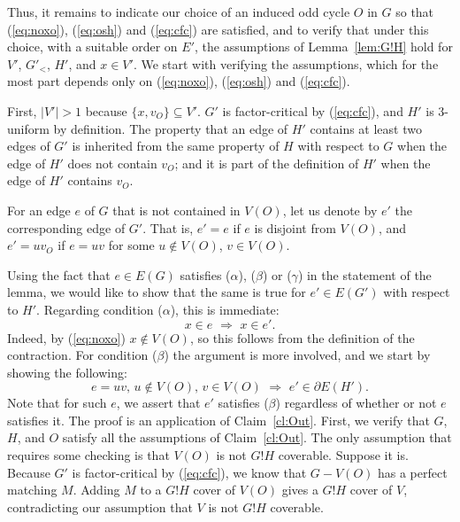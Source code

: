 \documentclass[10pt,a4paper]{amsart}
\begin{document}
Thus, it remains to indicate our choice of an induced odd cycle $O$ in $G$ so that (\ref{eq:noxo}), (\ref{eq:osh}) and (\ref{eq:cfc}) are satisfied, and to verify that under this choice, with a suitable order on $E'$, the assumptions of Lemma~\ref{lem:G!H} hold for $V'$, $G'_<$, $H'$, and $x \in V'$. We start with verifying the assumptions, which for the most part depends only on (\ref{eq:noxo}), (\ref{eq:osh}) and (\ref{eq:cfc}).

First, $|V'| > 1$ because $\{x, v_O\} \subseteq V'$. $G'$ is factor-critical by (\ref{eq:cfc}), and $H'$ is $3$-uniform by definition. The property that an edge of $H'$ contains at least two edges of $G'$ is inherited from the same property of $H$ with respect to $G$ when the edge of $H'$ does not contain $v_O$; and it is part of the definition of $H'$ when the edge of $H'$ contains $v_O$.

For an edge $e$ of $G$ that is not contained in $V(O)$, let us denote by $e'$ the corresponding edge of $G'$. That is, $e' = e$ if $e$ is disjoint from $V(O)$, and $e' = uv_O$ if $e = uv$ for some $u \notin V(O)$, $v \in V(O)$.

Using the fact that $e \in E(G)$ satisfies ($\alpha$), ($\beta$) or ($\gamma$) in the statement of the lemma, we would like to show that the same is true for $e' \in E(G')$ with respect to $H'$. Regarding condition ($\alpha$), this is immediate:
\begin{equation} \label{eq:con1}
x \in e \,\,\Longrightarrow\,\, x \in e'.
\end{equation}
Indeed, by (\ref{eq:noxo}) $x \notin V(O)$, so this follows from the definition of the contraction. For condition ($\beta$) the argument is more involved, and we start by showing the following:
\begin{equation} \label{eq:shad}
e = uv,\, u \notin V(O),\, v \in V(O)\,\,\Longrightarrow\,\, e' \in \partial E(H').
\end{equation}
Note that for such $e$, we assert that $e'$ satisfies ($\beta$) regardless of whether or not $e$ satisfies it. The proof is an application of Claim~\ref{cl:Out}. First, we verify that $G$, $H$, and $O$ satisfy all the assumptions of Claim~\ref{cl:Out}. The only assumption that requires some checking is that $V(O)$ is not $G!H$ coverable. Suppose it is. Because $G'$ is factor-critical by (\ref{eq:cfc}), we know that $G - V(O)$ has a perfect matching $M$. Adding $M$ to a $G!H$ cover of $V(O)$ gives a $G!H$ cover of $V$, contradicting our assumption that $V$ is not $G!H$ coverable.
\end{document}
